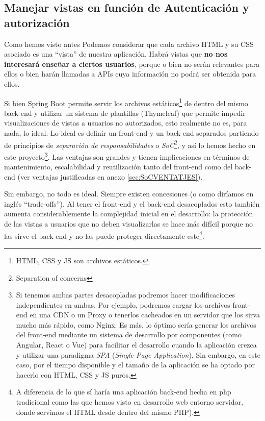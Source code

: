\documentclass[a4paper,12pt]{report}
\begin{document}
	
	
	
	
	
	
	
	\subsection{Manejar vistas en función de Autenticación y autorización}
	
	
	Como hemos visto antes Podemos considerar que cada archivo HTML y su CSS asociado es una ``vista'' de nuestra aplicación. Habrá vistas que \textbf{no nos interesará enseñar a ciertos usuarios}, porque o bien no serán relevantes para ellos o bien harán llamadas a APIs cuya información no podrá ser obtenida para ellos.
	
	Si bien Spring Boot permite servir los archivos estáticos\footnote{HTML, CSS y JS son archivos estáticos.}  de dentro del mismo back-end y utilizar un sistema de plantillas (Thymeleaf) que permite impedir visualizaciones de vistas a usuarios no autorizados, esto realmente no es, para nada, lo ideal. Lo ideal es definir un front-end y un back-end separados partiendo de principios de \textit{separación de responsabilidades} o \textit{SoC}\footnote{Separation of concerns}, y así lo hemos hecho en este proyecto\footnote{Si tenemos ambas partes desacopladas podremos hacer modificaciones independientes en ambas. Por ejemplo, podremos cargar los archivos front-end en una CDN o un Proxy o tenerlos cacheados en un servidor que los sirva mucho más rápido, como Nginx. Es más, lo óptimo sería generar los archivos del front-end mediante un sistema de desarrollo por componentes (como Angular, React o Vue) para facilitar el desarrollo cuando la aplicación crezca y utilizar una paradigma \textit{SPA} (\textit{Single Page Application}). Sin embargo, en este caso, por el tiempo disponible y el tamaño de la aplicación se ha optado por hacerlo con HTML, CSS y JS puros.}. Las ventajas son grandes y tienen implicaciones en términos de mantenimiento, escalabilidad y reutilización tanto del front-end como del back-end (ver ventajas justificadas en anexo \ref{sec:SoCVENTATJES}).
	

	
	
	
	
	Sin embargo, no todo es ideal. Siempre existen concesiones (o como diríamos en inglés ``trade-offs''). Al tener el front-end y el back-end desacoplados esto también aumenta considerablemente la complejidad inicial en el desarrollo: la protección de las vistas a usuarios que no deben visualizarlas se hace más difícil porque no las sirve el back-end y no las puede proteger directamente este\footnote{A diferencia de lo que sí haría una aplicación back-end hecha en php tradicional como las que hemos visto en desarrollo web entorno servidor, donde servimos el HTML desde dentro del mismo PHP).}.
	
\end{document}
